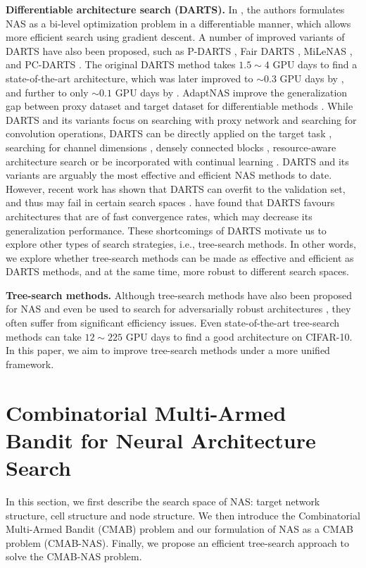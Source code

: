 \documentclass[conference]{IEEEtran}
\begin{document}
\noindent\textbf{Differentiable architecture search (DARTS).} In \cite{liu2018darts}, the authors formulates NAS as a bi-level optimization problem in a differentiable manner, which allows more efficient search using gradient descent. A number of improved variants of DARTS have also been proposed, such as P-DARTS \cite{Chen2019pdarts}, Fair DARTS \cite{chu2019fair}, MiLeNAS \cite{MiLeNAS}, and PC-DARTS \cite{DBLP:conf/iclr/XuX0CQ0X20}. The original DARTS method takes $1.5 \sim 4$ GPU days to find a state-of-the-art architecture, which was later improved to $\sim 0.3$ GPU days by \cite{Chen2019pdarts, chu2019fair, MiLeNAS}, and further to only $\sim 0.1$ GPU days by \cite{DBLP:conf/iclr/XuX0CQ0X20}. AdaptNAS improve the generalization gap between proxy dataset and target dataset for differentiable methods \cite{li2020adapting}.  While DARTS and its variants focus on searching with proxy network and searching for convolution operations, DARTS can be directly applied on the target task \cite{cai2018proxylessnas}, searching for channel dimensions \cite{wan2020fbnetv2}, densely connected blocks \cite{fang2020densely}, resource-aware architecture search \cite{Mei2020AtomNAS} or be incorporated with continual learning \cite{wu2020firefly}. DARTS and its variants are arguably the most effective and efficient NAS methods to date. However, recent work has shown that DARTS can overfit to the validation set, and thus may fail in certain search spaces \cite{DBLP:conf/iclr/ZelaESMBH20}. \cite{Shu2020Understanding, zhou2020theory} have found that DARTS favours architectures that are of fast convergence rates, which may decrease its generalization performance. These shortcomings of DARTS motivate us to explore other types of search strategies, i.e., tree-search methods. In other words, we explore whether tree-search methods can be made as effective and efficient as DARTS methods, and at the same time, more robust to different search spaces.

\noindent\textbf{Tree-search methods.} Although tree-search methods have also been proposed for NAS \cite{liu2018progressive, wang2019alphax} and even be used to search for adversarially robust architectures \cite{chen2020anti}, they often suffer from significant efficiency issues. Even state-of-the-art tree-search methods can take $12 \sim 225$ GPU days \cite{liu2018progressive, wang2019alphax} to find a good architecture on CIFAR-10.
In this paper, we aim to improve tree-search methods under a more unified framework.


\section{Combinatorial Multi-Armed Bandit for Neural Architecture Search}
In this section, we first describe the search space of NAS: target network structure, cell structure and node structure. 
We then introduce the Combinatorial Multi-Armed Bandit (CMAB) problem and our formulation of NAS as a CMAB problem (CMAB-NAS).
Finally, we propose an efficient tree-search approach to solve the CMAB-NAS problem.
\end{document}
